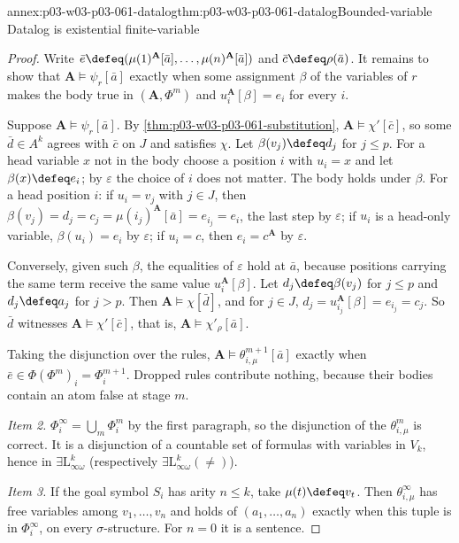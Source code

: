 \begin{annexitem}{annex:p03-w03-p03-061-datalog}{thm:p03-w03-p03-061-datalog}{Bounded-variable Datalog is existential finite-variable}
\begin{proof}
Write \(\bar e\defeq(\mu(1)^{\mathbf A}[\bar a],\ldots,\mu(n)^{\mathbf
A}[\bar a])\) and \(\bar c\defeq\rho(\bar a)\). It remains to show that
\(\mathbf A\models\psi_r[\bar a]\) exactly when some assignment \(\beta\) of
the variables of \(r\) makes the body true in \((\mathbf A,\Phi^m)\) and
\(u_i^{\mathbf A}[\beta]=e_i\) for every \(i\).

Suppose \(\mathbf A\models\psi_r[\bar a]\). By
\cref{thm:p03-w03-p03-061-substitution}, \(\mathbf A\models\chi'[\bar c]\),
so some \(\bar d\in A^k\) agrees with \(\bar c\) on \(J\) and satisfies
\(\chi\). Let \(\beta(v_j)\defeq d_j\) for \(j\le p\). For a head variable
\(x\) not in the body choose a position \(i\) with \(u_i=x\) and let
\(\beta(x)\defeq e_i\); by \(\varepsilon\) the choice of \(i\) does not
matter. The body holds under \(\beta\). For a head position \(i\): if
\(u_i=v_j\) with \(j\in J\), then
\(\beta(v_j)=d_j=c_j=\mu(i_j)^{\mathbf A}[\bar a]=e_{i_j}=e_i\), the last
step by \(\varepsilon\); if \(u_i\) is a head-only variable,
\(\beta(u_i)=e_i\) by \(\varepsilon\); if \(u_i=c\), then \(e_i=c^{\mathbf
A}\) by \(\varepsilon\).

Conversely, given such \(\beta\), the equalities of \(\varepsilon\) hold at
\(\bar a\), because positions carrying the same term receive the same value
\(u_i^{\mathbf A}[\beta]\). Let \(d_j\defeq\beta(v_j)\) for \(j\le p\) and
\(d_j\defeq a_j\) for \(j>p\). Then \(\mathbf A\models\chi[\bar d]\), and for
\(j\in J\), \(d_j=u_{i_j}^{\mathbf A}[\beta]=e_{i_j}=c_j\). So \(\bar d\)
witnesses \(\mathbf A\models\chi'[\bar c]\), that is,
\(\mathbf A\models\chi'_\rho[\bar a]\).

Taking the disjunction over the rules, \(\mathbf A\models
\theta^{m+1}_{i,\mu}[\bar a]\) exactly when \(\bar e\in\Phi(\Phi^m)_i=
\Phi^{m+1}_i\). Dropped rules contribute nothing, because their bodies
contain an atom false at stage \(m\).

\emph{Item 2.} \(\Phi^\infty_i=\bigcup_m\Phi^m_i\) by the first paragraph, so
the disjunction of the \(\theta^m_{i,\mu}\) is correct. It is a disjunction of
a countable set of formulas with variables in \(V_k\), hence in
\(\exists\mathrm L^k_{\infty\omega}\) (respectively
\(\exists\mathrm L^k_{\infty\omega}(\neq)\)).

\emph{Item 3.} If the goal symbol \(S_i\) has arity \(n\le k\), take
\(\mu(t)\defeq v_t\). Then \(\theta^\infty_{i,\mu}\) has free variables among
\(v_1,\ldots,v_n\) and holds of \((a_1,\ldots,a_n)\) exactly when this tuple
is in \(\Phi^\infty_i\), on every \(\sigma\)-structure. For \(n=0\) it is a
sentence.
\end{proof}
\end{annexitem}


